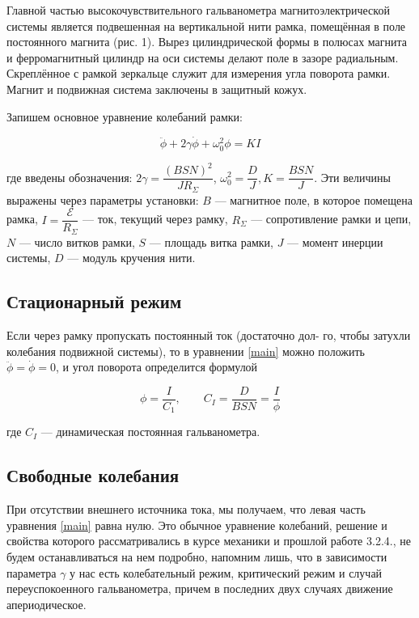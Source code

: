 \documentclass[12pt]{kiarticle}
\newcommand{\eds}{\ensuremath{ \mathscr{E}}}
\begin{document}
Главной частью высокочувствительного гальванометра магнитоэлектрической системы является подвешенная на вертикальной нити рамка, помещённая в поле постоянного магнита (рис. 1). Вырез цилиндрической формы в полюсах магнита и ферромагнитный цилиндр на оси системы делают поле в зазоре радиальным. Скреплённое с рамкой зеркальце служит для измерения угла поворота рамки. Магнит и подвижная система заключены в защитный кожух.

Запишем основное уравнение колебаний рамки:

\begin{equation}\label{main}
\ddot{\phi} + 2\gamma\dot{\phi }+ \omega_0^2\phi = K I
\end{equation}
	
	где введены обозначения: $ 2\gamma = \dfrac{(BSN)^2}{JR_\Sigma} $, $ \omega_0^2 = \dfrac{D}{J}, K = \dfrac{BSN}{J} $. Эти величины выражены через параметры установки: $ B $ --- магнитное поле, в которое помещена рамка, $ I  = \dfrac{\eds}{R_\Sigma}$ --- ток, текущий через рамку, $ R_\Sigma $ --- сопротивление рамки и цепи, $ N $ --- число витков рамки, $ S $ --- площадь витка рамки, $ J $ --- момент инерции системы, $ D $ --- модуль кручения нити.
	
	\subsection{Стационарный режим}
	Если через рамку пропускать постоянный ток (достаточно дол-
	го, чтобы затухли колебания подвижной системы), то в уравнении \eqref{main} можно положить $ \ddot{\phi} = \dot{\phi } = 0 $, и угол поворота определится формулой
	
	\begin{equation}\label{C1}
	\phi = \dfrac{I}{C_1}, \qquad C_I = \dfrac{D}{BSN} = \dfrac{I}{\phi}
	\end{equation}
	
	где $ C_I $ --- динамическая постоянная гальванометра.
	
	\subsection{Свободные колебания}
	
	При отсутствии внешнего источника тока, мы получаем, что левая часть уравнения \eqref{main} равна нулю. Это обычное уравнение колебаний, решение и свойства которого рассматривались в курсе механики и прошлой работе 3.2.4., не будем останавливаться на нем подробно, напомним лишь, что в зависимости параметра $ \gamma $ у нас есть колебательный режим, критический режим и случай переуспокоенного гальванометра, причем в последних двух случаях движение апериодическое. 
	
\end{document}
